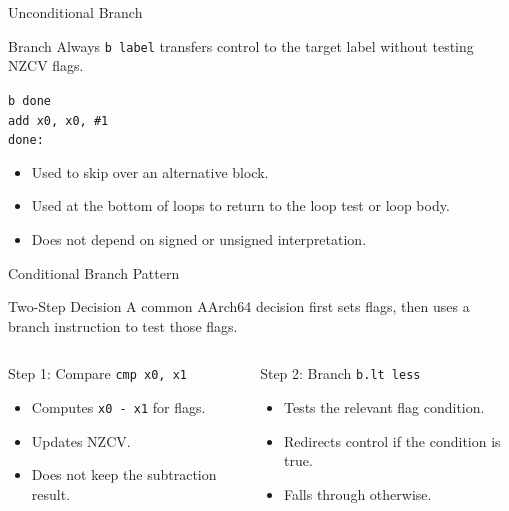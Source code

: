 \documentclass[aspectratio=169,11pt,t]{beamer}
\newcommand{\code}[1]{\texttt{#1}}
\begin{document}
\begin{frame}{Unconditional Branch}
\begin{block}{Branch Always}
\code{b label} transfers control to the target label without testing NZCV flags.
\end{block}
\vspace{0.25cm}
\large
\hspace{4.5cm}\code{b done}\\[0.15cm]
\hspace{4.5cm}\code{add x0, x0, \#1}\\[0.15cm]
\hspace{4.0cm}\code{done:}
\normalsize
\vspace{0.25cm}
\begin{itemize}
\item Used to skip over an alternative block.
\item Used at the bottom of loops to return to the loop test or loop body.
\item Does not depend on signed or unsigned interpretation.
\end{itemize}
\end{frame}




\begin{frame}{Conditional Branch Pattern}
\begin{block}{Two-Step Decision}
A common AArch64 decision first sets flags, then uses a branch instruction to test those flags.
\end{block}
\vspace{0.2cm}
\begin{columns}[T,onlytextwidth]
\begin{block}{Step 1: Compare}
\large
\hspace{1.7cm}\code{cmp x0, x1}
\normalsize
\begin{itemize}
\item Computes \code{x0 - x1} for flags.
\item Updates NZCV.
\item Does not keep the subtraction result.
\end{itemize}
\end{block}
\begin{block}{Step 2: Branch}
\large
\hspace{1.5cm}\code{b.lt less}
\normalsize
\begin{itemize}
\item Tests the relevant flag condition.
\item Redirects control if the condition is true.
\item Falls through otherwise.
\end{itemize}
\end{block}
\end{columns}
\end{frame}
\end{document}
